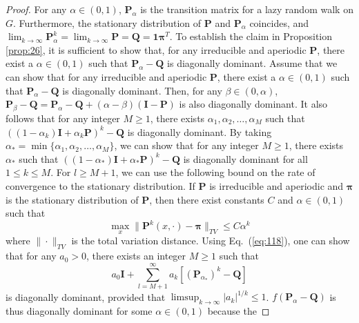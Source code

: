 \begin{proof}
  For any $\alpha \in (0,1)$, $\mathbf{P}_\alpha$ is the transition
  matrix for a lazy random walk on $G$.  Furthermore, the stationary
  distribution of $\mathbf{P}$ and $\mathbf{P}_{\alpha}$ coincides,
  and $\lim_{k \rightarrow \infty} \mathbf{P}_{\alpha}^{k} = \lim_{k
    \rightarrow \infty} \mathbf{P} = \mathbf{Q} =
  \mathbf{1}\bm{\pi}^{T}$. To establish the claim in Proposition
  \ref{prop:26}, it is sufficient to show that, for any irreducible
  and aperiodic $\mathbf{P}$, there exist a $\alpha \in (0,1)$ such
  that $\mathbf{P}_\alpha - \mathbf{Q}$ is diagonally dominant. Assume
  that we can show that for any irreducible and aperiodic
  $\mathbf{P}$, there exist a $\alpha \in (0,1)$ such that
  $\mathbf{P}_{\alpha} - \mathbf{Q}$ is diagonally dominant. Then, for
  any $\beta \in (0,\alpha)$, $\mathbf{P}_{\beta} - \mathbf{Q} =
  \mathbf{P}_{\alpha} - \mathbf{Q} + (\alpha - \beta)(\mathbf{I} -
  \mathbf{P})$ is also diagonally dominant. It also follows that for
  any integer $M \geq 1$, there exists $\alpha_1, \alpha_2, \dots,
  \alpha_M$ such that $((1 - \alpha_k)\mathbf{I} +
  \alpha_k\mathbf{P})^{k} - \mathbf{Q}$ is diagonally dominant. By
  taking $\alpha_* = \min\{\alpha_1, \alpha_2, \dots, \alpha_M\}$, we
  can show that for any integer $M \geq 1$, there exists $\alpha_*$
  such that $((1 - \alpha_*)\mathbf{I} + \alpha_* \mathbf{P})^{k} -
  \mathbf{Q}$ is diagonally dominant for all $1 \leq k \leq M$. For $l
  \geq M + 1$, we can use the following bound on the rate of
  convergence to the stationary distribution. If $\mathbf{P}$ is
  irreducible and aperiodic and $\bm{\pi}$ is the stationary
  distribution of $\mathbf{P}$, then there exist constants $C$ and $\alpha \in
  (0,1)$ such that   
  \begin{equation}
    \label{eq:118}
   \max_{x} \| \mathbf{P}^{k}(x,\cdot) - \bm{\pi} \|_{TV} \leq C \alpha^{k} 
  \end{equation}
  where $\| \cdot \|_{TV}$ is the total variation distance. Using 
  Eq.~(\ref{eq:118}), one can show that for any $a_0 > 0$, there
  exists an integer $M \geq 1$ such that 
  \begin{equation}
    \label{eq:119}
    a_0 \mathbf{I} + \sum_{l = M + 1}^{\infty} a_k[
    (\mathbf{P}_{\alpha_*})^{k} - \mathbf{Q}]
  \end{equation}
  is diagonally dominant, provided that $\limsup_{k \rightarrow
    \infty}{|a_k|^{1/k}} \leq 1$.  $f(\mathbf{P}_{\alpha} - \mathbf{Q})$
  is thus diagonally dominant for some $\alpha \in (0,1)$ because the

\end{proof}
